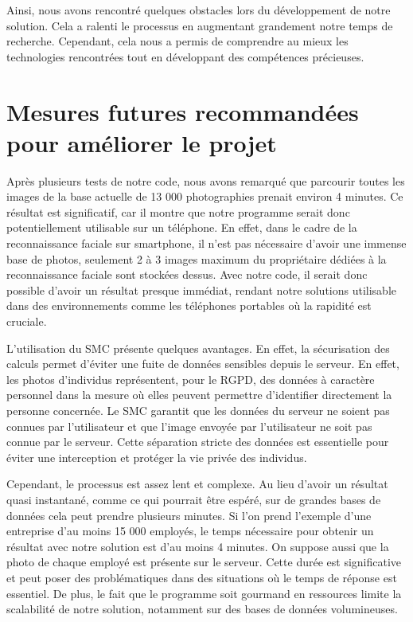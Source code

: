 \documentclass[12pt,a4paper]{article}
\begin{document}
Ainsi, nous avons rencontré quelques obstacles lors du développement de notre solution. Cela a ralenti le processus en augmentant grandement notre temps de recherche. Cependant, cela nous a permis de comprendre au mieux les technologies rencontrées tout en développant des compétences précieuses.

\section{Mesures futures recommandées pour améliorer le projet}
Après plusieurs tests de notre code, nous avons remarqué que parcourir toutes les images de la base actuelle de 13 000 photographies prenait environ 4 minutes. Ce résultat est significatif, car il montre que notre programme serait donc potentiellement utilisable sur un téléphone. En effet, dans le cadre de la reconnaissance faciale sur smartphone, il n'est pas nécessaire d'avoir une immense base de photos, seulement 2 à 3 images maximum du propriétaire dédiées à la reconnaissance faciale sont stockées dessus. Avec notre code, il serait donc possible d'avoir un résultat presque immédiat, rendant notre solutions utilisable dans des environnements comme les téléphones portables où la rapidité est cruciale. 

L'utilisation du SMC présente quelques avantages. En effet, la sécurisation des calculs permet d'éviter une fuite de données sensibles depuis le serveur. En  effet, les photos d'individus représentent, pour le RGPD, des données à caractère personnel dans la mesure où elles peuvent permettre d'identifier directement la personne concernée. Le SMC garantit que les données du serveur ne soient pas connues par l'utilisateur et que l'image envoyée par l'utilisateur ne soit pas connue par le serveur. Cette séparation stricte des données est essentielle pour éviter une interception et protéger la vie privée des individus.

Cependant, le processus est assez lent et complexe. Au lieu d'avoir un résultat quasi instantané, comme ce qui pourrait être espéré, sur de grandes bases de données cela peut prendre plusieurs minutes. Si l'on prend l'exemple d'une entreprise d'au moins 15 000 employés, le temps nécessaire pour obtenir un résultat avec notre solution est d'au moins 4 minutes. On suppose aussi que la photo de chaque employé est présente sur le serveur. Cette durée est significative et peut poser des problématiques dans des situations où le temps de réponse est essentiel. De plus, le fait que le programme soit gourmand en ressources limite la scalabilité de notre solution, notamment sur des bases de données volumineuses.
\end{document}
